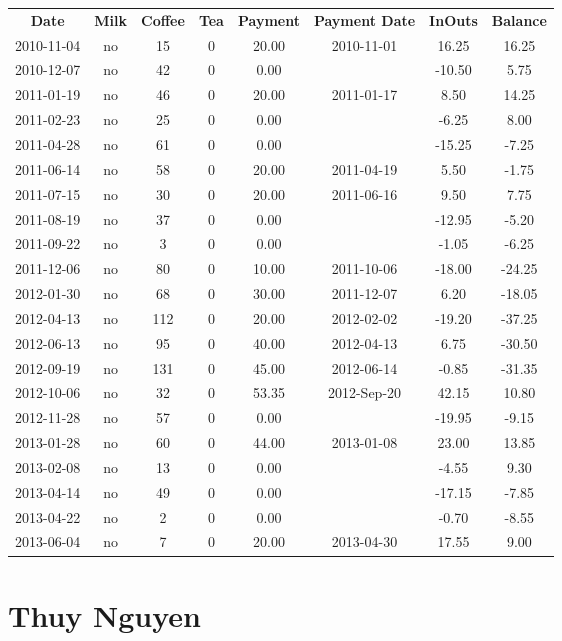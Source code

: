 \begin{center}
\begin{tabular}{cccccccc}
\textbf{Date} & \textbf{Milk} & \textbf{Coffee} & \textbf{Tea} & \textbf{Payment} & \textbf{Payment Date} & \textbf{InOuts} & \textbf{Balance} \\
2010-11-04 & no &  15 & 0 & 20.00 & 2010-11-01 &  16.25 &  16.25\\ 
2010-12-07 & no &  42 & 0 &  0.00 &  & -10.50 &   5.75\\ 
2011-01-19 & no &  46 & 0 & 20.00 & 2011-01-17 &   8.50 &  14.25\\ 
2011-02-23 & no &  25 & 0 &  0.00 &  &  -6.25 &   8.00\\ 
2011-04-28 & no &  61 & 0 &  0.00 &  & -15.25 &  -7.25\\ 
2011-06-14 & no &  58 & 0 & 20.00 & 2011-04-19 &   5.50 &  -1.75\\ 
2011-07-15 & no &  30 & 0 & 20.00 & 2011-06-16 &   9.50 &   7.75\\ 
2011-08-19 & no &  37 & 0 &  0.00 &  & -12.95 &  -5.20\\ 
2011-09-22 & no &   3 & 0 &  0.00 &  &  -1.05 &  -6.25\\ 
2011-12-06 & no &  80 & 0 & 10.00 & 2011-10-06 & -18.00 & -24.25\\ 
2012-01-30 & no &  68 & 0 & 30.00 & 2011-12-07 &   6.20 & -18.05\\ 
2012-04-13 & no & 112 & 0 & 20.00 & 2012-02-02 & -19.20 & -37.25\\ 
2012-06-13 & no &  95 & 0 & 40.00 & 2012-04-13 &   6.75 & -30.50\\ 
2012-09-19 & no & 131 & 0 & 45.00 & 2012-06-14 &  -0.85 & -31.35\\ 
2012-10-06 & no &  32 & 0 & 53.35 & 2012-Sep-20 &  42.15 &  10.80\\ 
2012-11-28 & no &  57 & 0 &  0.00 &  & -19.95 &  -9.15\\ 
2013-01-28 & no &  60 & 0 & 44.00 & 2013-01-08 &  23.00 &  13.85\\ 
2013-02-08 & no &  13 & 0 &  0.00 &  &  -4.55 &   9.30\\ 
2013-04-14 & no &  49 & 0 &  0.00 &  & -17.15 &  -7.85\\ 
2013-04-22 & no &   2 & 0 &  0.00 &  &  -0.70 &  -8.55\\ 
2013-06-04 & no &   7 & 0 & 20.00 & 2013-04-30 &  17.55 &   9.00
\end{tabular}
\end{center}

\section{Thuy Nguyen}

